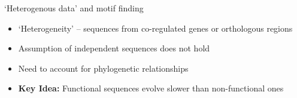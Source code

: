 \documentclass[10pt]{beamer}
\newcommand{\highlight}[1]{%
  \colorbox{red!50}{$\displaystyle#1$}}
\begin{document}

\begin{frame}[fragile]{`Heterogenous data' and motif finding}
	  \begin{itemize}
      \item `Heterogeneity' -- sequences from co-regulated genes or orthologous regions
      \item Assumption of independent sequences does not hold
      \item Need to account for phylogenetic relationships
      \item \textbf{Key Idea:} Functional sequences evolve slower than non-functional ones
      \end{itemize}
\end{frame}
\end{document}
